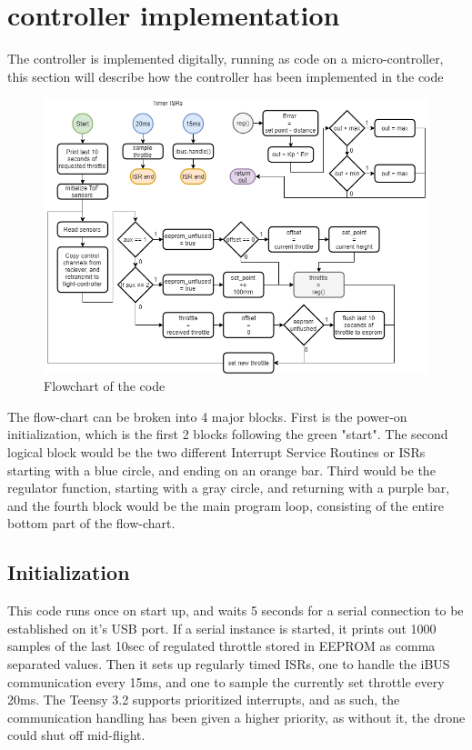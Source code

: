 \section{controller implementation}\label{sec:control_code}
The controller is implemented digitally, running as code on a micro-controller, this section will describe how the controller has been implemented in the code

\begin{figure}[H]
    \centering
    \includegraphics[width=1\textwidth]{figures/ch_design/controller/EIT5-code.png}
    \caption{Flowchart of the code}
    \label{fig:code_flowchart}
\end{figure}

The flow-chart can be broken into 4 major blocks. First is the power-on initialization, which is the first 2 blocks following the green "start". The second logical block would be the two different Interrupt Service Routines or ISRs starting with a blue circle, and ending on an orange bar. Third would be the regulator function, starting with a gray circle, and returning with a purple bar, and the fourth block would be the main program loop, consisting of the entire bottom part of the flow-chart.

\subsection*{Initialization}
This code runs once on start up, and waits 5 seconds for a serial connection to be established on it's USB port. If a serial instance is started, it prints out 1000 samples of the last 10sec of regulated throttle stored in EEPROM as comma separated values.
Then it sets up regularly timed ISRs, one to handle the iBUS communication every 15ms, and one to sample the currently set throttle every 20ms.
The Teensy 3.2 supports prioritized interrupts, and as such, the communication handling has been given a higher priority, as without it, the drone could shut off mid-flight.

